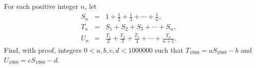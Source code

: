 For each positive integer $n$,  let\begin{eqnarray*} S_n &=& 1 + \frac 12 + \frac 13 + \cdots + \frac 1n, \\ T_n &=& S_1 + S_2 + S_3 + \cdots + S_n, \\ U_n &=& \frac{T_1}{2} + \frac{T_2}{3} + \frac{T_3}{4} + \cdots + \frac{T_n}{n+1}. \end{eqnarray*} Find, with proof, integers $0 < a, b,c, d < 1000000$ such that $T_{1988} = a S_{1989} - b$ and $U_{1988} = c S_{1989} - d$.